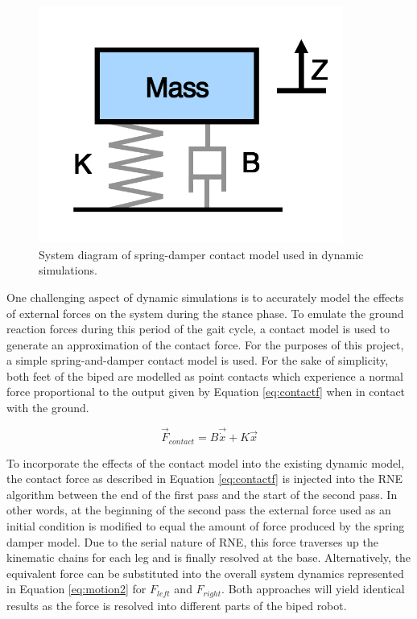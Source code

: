 \begin{figure}[!ht]
	\begin{center}
    \includegraphics[width=100mm]{fig/ch5/springdamper.png}
	\end{center}
  \caption{System diagram of spring-damper contact model used in dynamic simulations.}
\end{figure}

One challenging aspect of dynamic simulations is to accurately model the effects of external forces on the system during the stance phase. To emulate the ground reaction forces during this period of the gait cycle, a contact model is used to generate an approximation of the contact force. For the purposes of this project, a simple spring-and-damper contact model is used. For the sake of simplicity, both feet of the biped are modelled as point contacts which experience a normal force proportional to the output given by Equation \ref{eq:contactf} when in contact with the ground. 

\begin{equation}
	\label{eq:contactf}
	\vec{F}_{contact} = B\vec{\dot{x}} + K\vec{x}
\end{equation}


To incorporate the effects of the contact model into the existing dynamic model, the contact force as described in Equation \ref{eq:contactf} is injected into the RNE algorithm between the end of the first pass and the start of the second pass. In other words, at the beginning of the second pass the external force used as an initial condition is modified to equal the amount of force produced by the spring damper model. Due to the serial nature of RNE, this force traverses up the kinematic chains for each leg and is finally resolved at the base. Alternatively, the equivalent force can be substituted into the overall system dynamics represented in Equation \ref{eq:motion2} for $F_{left}$ and $F_{right}$. Both approaches will yield identical results as the force is resolved into different parts of the biped robot. 

